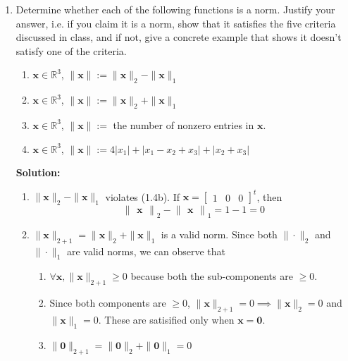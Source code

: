 \documentclass[]{article}
\newcommand{\R}{\mathbb{R}}
\newcommand{\bbm}{\begin{bmatrix}}
\newcommand{\ebm}{\end{bmatrix}}
\newcommand{\bnm}{\begin{Vmatrix}}
\newcommand{\enm}{\end{Vmatrix}}
\newcommand{\solution}{\vskip 0.5cm \textbf{\large Solution:} \\}
\begin{document}
\begin{enumerate}[resume]
	
	\item Determine whether each of the following functions is a norm. Justify your answer, i.e. if you claim it is a norm, show that it satisfies the five criteria discussed in class, and if not, give a concrete example that shows it doesn't satisfy one of the criteria.
	
	\begin{enumerate}
		\item $\bm{x}\in\R^3$, $\|\bm{x}\| := \|\bm{x}\|_2-\|\bm{x}\|_1$
		\item $\bm{x}\in\R^3$, $\|\bm{x}\| := \|\bm{x}\|_2 + \|\bm{x}\|_1$
		\item $\bm{x}\in\R^3$, $\|\bm{x}\| := $ the number of nonzero entries in $\bm{x}$.
		\item $\bm{x}\in\R^3$, $\|\bm{x}\| := 4|x_1| + |x_1-x_2+x_3| + |x_2+x_3|$
	\end{enumerate}

	\solution
	\begin{enumerate}
	\item $\|\bm{x}\|_2-\|\bm{x}\|_1$ violates (1.4b). If $\bm{x} = \bbm 1 & 0 & 0 \ebm^t$, then
      \[
        \bnm\bm{x}\enm_2 - \bnm\bm{x}\enm_1 = 1 - 1 = 0
      \]

		\item $\|\bm{x}\|_{2+1} = \|\bm{x}\|_2 + \|\bm{x}\|_1$ is a
          valid norm. Since both $\|\cdot\|_2$ and $\|\cdot\|_1$ are valid
          norms, we can observe that
          \begin{enumerate}
          \item $\forall \bm{x}, \|\bm{x}\|_{2+1} \geq 0$ because
            both the sub-components are $\geq 0$.
          \item Since both components are $\geq 0$, $\|\bm{x}\|_{2+1}
            = 0 \implies \|\bm{x}\|_{2} = 0$ and $\|\bm{x}\|_{1} =
            0$. These are satisified only when $\bm{x} = \bm{0}$.

          \item $\|\bm{0}\|_{2+1} = \|\bm{0}\|_{2} + \|\bm{0}\|_{1} = 0$
            

\end{enumerate}
\end{enumerate}
\end{enumerate}
\end{document}

